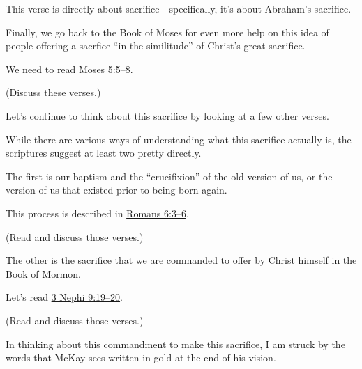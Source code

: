 \begin{compactitem}
\begin{compactitem}
\begin{compactitem}
							\item This verse is directly about sacrifice---specifically, it's about Abraham's sacrifice.
							\item {}
							\item Finally, we go back to the Book of Moses for even more help on this idea of people offering a sacrfice ``in the similitude'' of Christ's great sacrifice.
							\item We need to read \hyperref[MOSES-5-5]{Moses 5:5--8}.
							\item (Discuss these verses.)
							\item {}
						\end{compactitem}
					\item Let's continue to think about this sacrifice by looking at a few other verses.
						\begin{compactitem}
							\item While there are various ways of understanding what this sacrifice actually is, the scriptures suggest at least two pretty directly.
							\item The first is our baptism and the ``crucifixion'' of the old version of us, or the version of us that existed prior to being born again.
							\item This process is described in \hyperref[ROMANS-6-3]{Romans 6:3--6}.
							\item (Read and discuss those verses.)
							\item The other is the sacrifice that we are commanded to offer by Christ himself in the Book of Mormon.
							\item Let's read \hyperref[3NEPHI-9-19]{3 Nephi 9:19--20}.
							\item (Read and discuss those verses.)
						\end{compactitem}
					\item {}
					\item {}
					\item In thinking about this commandment to make this sacrifice, I am struck by the words that McKay sees written in gold at the end of his vision.

\end{compactitem}
\end{compactitem}
